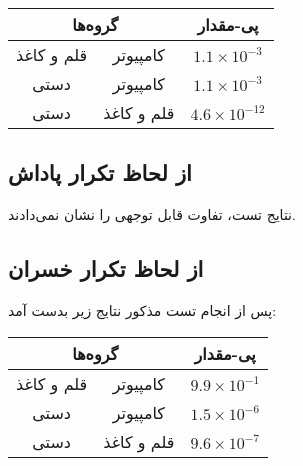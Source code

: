 \documentclass{article}
\begin{document}
\begin{table}[h]
\begin{center}
\begin{tabular}{|c|c|c|}
\hline
\multicolumn{2}{|c|}{گروه‌ها} & پی-مقدار \\
\hline
قلم و کاغذ & کامپیوتر 
& $1.1 \times  10^{-3} $ \\ \hline
دستی & کامپیوتر 
& $1.1 \times  10^{-3} $ \\ \hline
دستی & قلم و کاغذ 
& $4.6 \times  10^{-12} $ \\
 \hline
\end{tabular}
\end{center}
\end{table}

\subsection{از لحاظ تکرار پاداش}
نتایج تست، تفاوت قابل توجهی را نشان نمی‌دادند.

\subsection{از لحاظ تکرار خسران}
پس از انجام تست مذکور نتایج زیر بدست آمد:


\begin{table}[h]
\begin{center}
\begin{tabular}{|c|c|c|}
\hline
\multicolumn{2}{|c|}{گروه‌ها} & پی-مقدار \\
\hline
قلم و کاغذ & کامپیوتر 
& $9.9 \times  10^{-1} $ \\ \hline
دستی & کامپیوتر 
& $1.5 \times  10^{-6} $ \\ \hline
دستی & قلم و کاغذ 
& $9.6 \times  10^{-7} $ \\
 \hline
\end{tabular}
\end{center}
\end{table}
\end{document}
